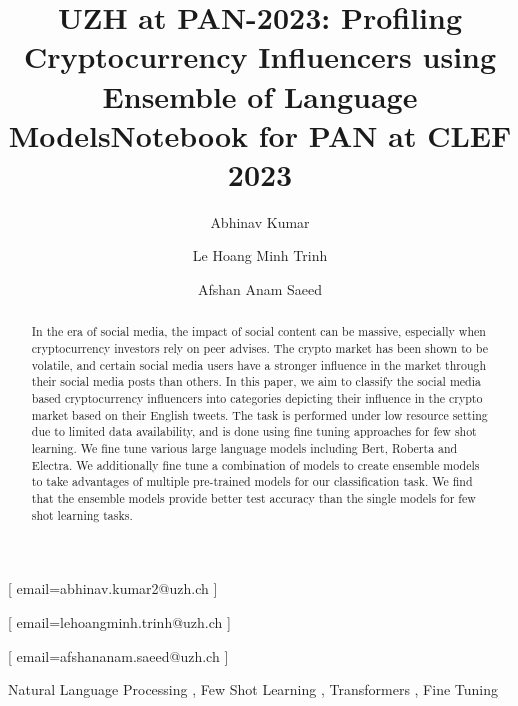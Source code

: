 \documentclass[]{ceurart}
\begin{document}


\title{UZH at PAN-2023: Profiling Cryptocurrency Influencers using Ensemble of Language Models}
\title[mode=sub]{Notebook for PAN at CLEF 2023}


\author{Abhinav Kumar}[%
email=abhinav.kumar2@uzh.ch
]
\author{Le Hoang Minh Trinh}[%
email=lehoangminh.trinh@uzh.ch
]

\author{Afshan Anam Saeed}[%
email=afshananam.saeed@uzh.ch
]

\address{University of Zurich, Zurich, Switzerland
\\All authors contributed equally.
}


\begin{abstract}
  In the era of social media, the impact of social content can be massive, especially when cryptocurrency investors rely on peer advises. The crypto market has been shown to be volatile, and certain social media users have a stronger influence in the market through their social media posts than others. In this paper, we aim to classify the social media based cryptocurrency influencers into categories depicting their influence in the crypto market based on their English tweets. The task is performed under low resource setting due to limited data availability, and is done using fine tuning approaches for few shot learning. We fine tune various large language models including Bert, Roberta and Electra. We additionally fine tune a combination of models to create ensemble models to take advantages of multiple pre-trained models for our classification task. We find that the ensemble models provide better test accuracy than the single models for few shot learning tasks.
\end{abstract}

\begin{keywords}
  Natural Language Processing \sep
  Few Shot Learning \sep
  Transformers \sep
  Fine Tuning
\end{keywords}
\end{document}
